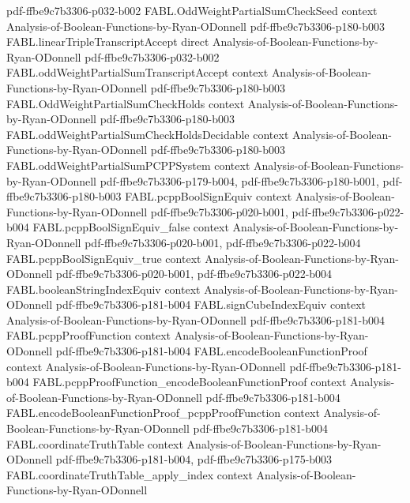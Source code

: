 \begin{theorem}
  {pdf-ffbe9c7b3306-p032-b002}
\proofstep
  {FABL.OddWeightPartialSumCheckSeed}
  {context}
  {Analysis-of-Boolean-Functions-by-Ryan-ODonnell}
  {pdf-ffbe9c7b3306-p180-b003}
\proofstep
  {FABL.linearTripleTranscriptAccept}
  {direct}
  {Analysis-of-Boolean-Functions-by-Ryan-ODonnell}
  {pdf-ffbe9c7b3306-p032-b002}
\proofstep
  {FABL.oddWeightPartialSumTranscriptAccept}
  {context}
  {Analysis-of-Boolean-Functions-by-Ryan-ODonnell}
  {pdf-ffbe9c7b3306-p180-b003}
\proofstep
  {FABL.OddWeightPartialSumCheckHolds}
  {context}
  {Analysis-of-Boolean-Functions-by-Ryan-ODonnell}
  {pdf-ffbe9c7b3306-p180-b003}
\proofstep
  {FABL.oddWeightPartialSumCheckHoldsDecidable}
  {context}
  {Analysis-of-Boolean-Functions-by-Ryan-ODonnell}
  {pdf-ffbe9c7b3306-p180-b003}
\proofstep
  {FABL.oddWeightPartialSumPCPPSystem}
  {context}
  {Analysis-of-Boolean-Functions-by-Ryan-ODonnell}
  {pdf-ffbe9c7b3306-p179-b004,
    pdf-ffbe9c7b3306-p180-b001,
    pdf-ffbe9c7b3306-p180-b003}
\proofstep
  {FABL.pcppBoolSignEquiv}
  {context}
  {Analysis-of-Boolean-Functions-by-Ryan-ODonnell}
  {pdf-ffbe9c7b3306-p020-b001,
    pdf-ffbe9c7b3306-p022-b004}
\proofstep
  {FABL.pcppBoolSignEquiv_false}
  {context}
  {Analysis-of-Boolean-Functions-by-Ryan-ODonnell}
  {pdf-ffbe9c7b3306-p020-b001,
    pdf-ffbe9c7b3306-p022-b004}
\proofstep
  {FABL.pcppBoolSignEquiv_true}
  {context}
  {Analysis-of-Boolean-Functions-by-Ryan-ODonnell}
  {pdf-ffbe9c7b3306-p020-b001,
    pdf-ffbe9c7b3306-p022-b004}
\proofstep
  {FABL.booleanStringIndexEquiv}
  {context}
  {Analysis-of-Boolean-Functions-by-Ryan-ODonnell}
  {pdf-ffbe9c7b3306-p181-b004}
\proofstep
  {FABL.signCubeIndexEquiv}
  {context}
  {Analysis-of-Boolean-Functions-by-Ryan-ODonnell}
  {pdf-ffbe9c7b3306-p181-b004}
\proofstep
  {FABL.pcppProofFunction}
  {context}
  {Analysis-of-Boolean-Functions-by-Ryan-ODonnell}
  {pdf-ffbe9c7b3306-p181-b004}
\proofstep
  {FABL.encodeBooleanFunctionProof}
  {context}
  {Analysis-of-Boolean-Functions-by-Ryan-ODonnell}
  {pdf-ffbe9c7b3306-p181-b004}
\proofstep
  {FABL.pcppProofFunction_encodeBooleanFunctionProof}
  {context}
  {Analysis-of-Boolean-Functions-by-Ryan-ODonnell}
  {pdf-ffbe9c7b3306-p181-b004}
\proofstep
  {FABL.encodeBooleanFunctionProof_pcppProofFunction}
  {context}
  {Analysis-of-Boolean-Functions-by-Ryan-ODonnell}
  {pdf-ffbe9c7b3306-p181-b004}
\proofstep
  {FABL.coordinateTruthTable}
  {context}
  {Analysis-of-Boolean-Functions-by-Ryan-ODonnell}
  {pdf-ffbe9c7b3306-p181-b004,
    pdf-ffbe9c7b3306-p175-b003}
\proofstep
  {FABL.coordinateTruthTable_apply_index}
  {context}
  {Analysis-of-Boolean-Functions-by-Ryan-ODonnell}

\end{theorem}
